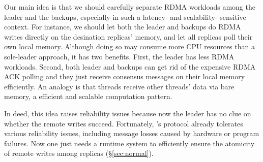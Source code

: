 

Our main idea is that we should carefully separate RDMA workloads among 
the leader and the backups, especially in such a latency- and scalability- 
sensitive context. For instance, we should let both the leader and backups 
do RDMA writes directly on the desination replicas' memory, and let all 
replicas poll their own local memory. Although doing so may consume more CPU 
resources than a sole-leader approach, it has two benefits. First, the 
leader has less RDMA workloads. Second, both leader and backups can get rid of 
the expensive RDMA ACK polling and they just receive consensus messages on their 
local memory efficiently. An analogy is that threads receive other threads' data 
via bare memory, a efficient and scalable computation pattern.



In deed, this idea raises reliability issues because now the leader has no clue 
on whether the remote writes succeed. Fortunately, \paxos's protocol already 
tolerates various reliability issues, including message losses caused by 
hardware or program failures. Now one just needs a runtime system to efficiently 
ensure the atomicity of remote writes among replicas (\S\ref{sec:normal}).



